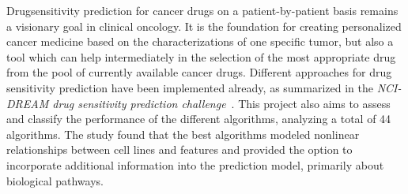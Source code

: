 Drugsensitivity prediction for cancer drugs on a patient-by-patient basis remains a visionary goal in clinical oncology.
It is the foundation for creating personalized cancer medicine based on the characterizations of one specific tumor, but also a tool which can help intermediately in the selection of the most appropriate drug from the pool of currently available cancer drugs.
Different approaches for drug sensitivity prediction have been implemented already, as summarized in the \emph{NCI-DREAM drug sensitivity prediction challenge}~\cite{nci_dream}.
This project also aims to assess and classify the performance of the different algorithms, analyzing a total of 44 algorithms.
The study found that the best algorithms modeled nonlinear relationships between cell lines and features and provided the option to incorporate additional information into the prediction model, primarily about biological pathways.

